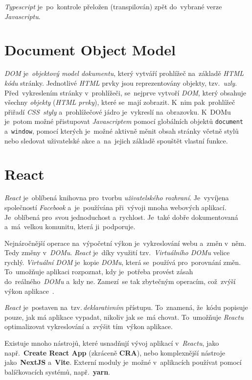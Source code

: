 \documentclass[11pt,a4paper]{report}
\begin{document}
            \emph{Typescript} je~po~kontrole přeložen (transpilován) zpět do~vybrané verze \emph{Javascriptu}. \cite[Get started/TypeScript for the New Programmer]{TypeScript}

        \section{Document Object Model}
            \emph{DOM} je~\emph{objektový model dokumentu}, který vytváří prohlížeč na~základě \emph{HTML kódu} stránky. Jednotlivé \emph{HTML} prvky jsou reprezentovány objekty, tzv.~\emph{uzly}. Před~vykreslením stránky v~prohlížeči, se~nejprve vytvoří \emph{DOM}, který obsahuje všechny \emph{objekty} (\emph{HTML prvky}), které se~mají zobrazit. K~nim pak~prohlížeč přiřadí \emph{CSS~styly} a~prohlížečové jádro je~vykreslí na~obrazovku. K~DOMu je~potom možné přistupovat \emph{Javascriptem} pomocí globálních objektů \texttt{document} a~\texttt{window}, pomocí kterých je~možné aktivně měnit obsah stránky včetně stylů nebo sledovat uživatelské akce a~na~jejich základě spouštět vlastní funkce.\cite[2.1.01]{kantor_javascript}
        
        \section{React}
            \emph{React} je~oblíbená knihovna pro~tvorbu \emph{uživatelského rozhraní}. Je~vyvíjena společností \emph{Facebook} a~je~používána při~vývoji mnoha webových aplikací. Je~oblíbená pro~svou jednoduchost a~rychlost. Je~také dobře dokumentovaná a~má~velkou komunitu, která ji~podporuje.
            
            Nejnáročnější operace na~výpočetní výkon je~vykreslování webu a~změn v~něm. Tedy změny v~\emph{DOMu}. \emph{React} je~díky využití tzv.~\emph{Virtuálního DOMu} velice rychlý. \emph{Virtuální DOM} je~kopie \emph{DOMu}, která se~používá pro~porovnání změn. To~umožňuje aplikaci rozpoznat, kdy je~potřeba provést zásah do~reálného~\emph{DOMu} a~kdy ne. Zamezí~se tak zbytečným operacím, což~zvýší výkon aplikace~\cite{elrom2021react}.
            
            \emph{React} je~postaven na~tzv.\,\emph{deklarativním} přístupu. To~znamená, že~kódu popisuje pouze, jak má aplikace vypadat, nikoliv jak se~má chovat. To~umožňuje \emph{Reactu} optimalizovat vykreslování a~zvýšit tím~výkon aplikace.
            
            Existuje mnoho nástrojů, které usnadňují vývoj aplikací v~\emph{Reactu}, jako např.~\textbf{Create React App} (zkráceně \textbf{CRA}), nebo komplexnější nástroje jako~\textbf{NextJS} a~\textbf{Vite}. Externí moduly je~možné v~aplikacích používat pomocí balíčkovacích systémů, např.~\textbf{yarn}.
\end{document}
